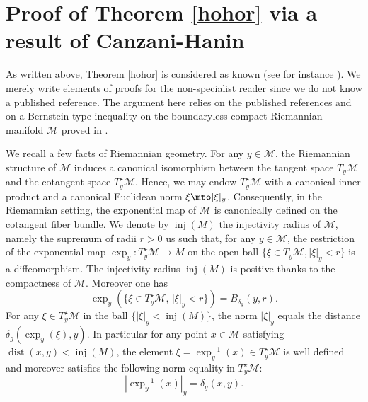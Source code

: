 \section{Proof of Theorem \ref{hohor} via a result of Canzani-Hanin}\label{annex-weyl}

As written above, Theorem \ref{hohor} is considered as known (see for instance \cite[lines (4),\,(5) \& (8)]{canzani2017c}).
We merely write elements of proofs for the non-specialist reader since we do not know a published reference.
The argument here relies on the published references \cite{canzani2017c,sogge2017fourier} and on a Bernstein-type inequality on the boundaryless compact Riemannian manifold $\mathcal{M}$ proved in
\cite[line (11)]{bin2004}.

We recall a few facts of Riemannian geometry. For any $y\in \mathcal{M}$, the Riemannian structure of $\mathcal{M}$ induces a canonical isomorphism between the tangent space $T_y\mathcal{M}$ and the cotangent space $T_{y}^\star \mathcal{M}$. Hence, we may endow $T_y^\star \mathcal{M}$ with a canonical inner product and a canonical Euclidean norm $\xi\mto |\xi|_{y}$.
Consequently, in the Riemannian setting, the exponential map of $\mathcal{M}$ is canonically defined on the cotangent fiber bundle.
We denote by $\operatorname{inj}(M)$ the injectivity radius of $\mathcal{M}$, namely the supremum of radii $r>0$ us such that, for any $y\in \mathcal{M}$, the restriction of the exponential map $\exp_y:T_y^\star\mathcal{M}\to M$ on the open ball $\{\xi\in T_y\mathcal{M}, |\xi|_{y}< r\}$ is a diffeomorphism.
The injectivity radius $\operatorname{inj}(M)$ is positive thanks to the compactness of $\mathcal{M}$. Moreover one has
\begin{equation*}
\exp_y(\{\xi\in T_y^\star \mathcal{M},\, |\xi|_{y}< r\})=B_{\delta_g}(y,r).
\end{equation*}
For any $\xi\in T_y^\star \mathcal{M}$ in the ball $\{|\xi|_y<\operatorname{inj}(M)\}$, the norm $|\xi|_y$ equals the distance $\delta_g(\exp_y(\xi),y)$.
In particular for any point $x\in \mathcal{M}$ satisfying $\operatorname{dist}(x,y)<\operatorname{inj}(M)$, the element $\xi=\exp_y^{-1}(x)\in T_y^\star \mathcal{M}$ is well defined and moreover satisfies the following norm equality in $T_y^\star \mathcal{M}$:
\begin{equation}\label{norm-exp}
|\exp_y^{-1}(x)|_{y}=\delta_g(x,y).
\end{equation}

